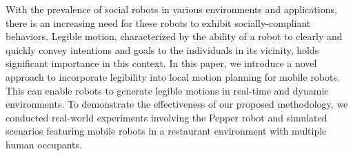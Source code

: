 With the prevalence of social robots in various environments and applications, there is an increasing need for these robots to exhibit socially-compliant behaviors.
Legible motion, characterized by the ability of a robot to clearly and quickly convey intentions and goals to the individuals in its vicinity, holds significant importance in this context.
%
%
In this paper, we introduce a novel approach to incorporate legibility into local motion planning for mobile robots.
This can enable robots to generate legible motions in real-time and dynamic environments.
%
To demonstrate the effectiveness of our proposed methodology,
we conducted real-world experiments involving the Pepper robot and simulated scenarios featuring mobile robots in a restaurant environment with multiple human occupants.